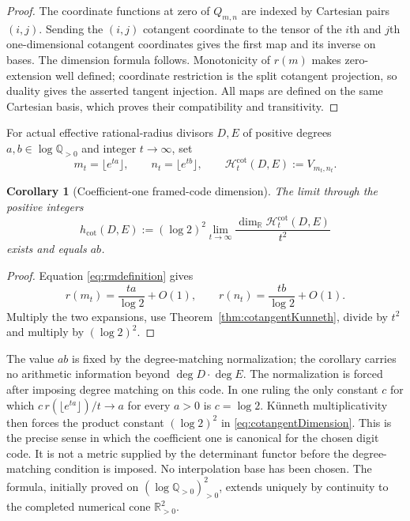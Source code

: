 \documentclass[11pt]{amsart}
\newtheorem{corollary}[theorem]{Corollary}
\theoremstyle{definition}
\theoremstyle{remark}
\newcommand{\R}{\mathbb R}
\newcommand{\Q}{\mathbb Q}
\begin{document}
\begin{proof}
The coordinate functions at zero of $Q_{m,n}$ are indexed by Cartesian
pairs $(i,j)$.  Sending the $(i,j)$ cotangent coordinate to the tensor of the
$i$th and $j$th one-dimensional cotangent coordinates gives the first map and its
inverse on bases.  The dimension formula follows.  Monotonicity of
$r(m)$ makes zero-extension well defined; coordinate restriction is the
split cotangent projection, so duality gives the asserted tangent
injection.  All maps are defined on the same Cartesian basis, which proves
their compatibility and transitivity.
\end{proof}

For actual effective rational-radius divisors $D,E$ of positive degrees
$a,b\in\log\Q_{>0}$ and integer $t\to\infty$, set
\begin{equation}\label{eq:scaledCode}
 m_t=\lfloor e^{ta}\rfloor,\qquad n_t=\lfloor e^{tb}\rfloor,\qquad
 \mathcal H_t^{\mathrm{cot}}(D,E):=V_{m_t,n_t}.
\end{equation}

\begin{corollary}[Coefficient-one framed-code dimension]
\label{cor:cotangentRRdimension}
The limit through the positive integers
\begin{equation}\label{eq:cotangentDimension}
 h_{\mathrm{cot}}(D,E):=(\log2)^2
 \lim_{t\to\infty}\frac{\dim_{\R}\mathcal H_t^{\mathrm{cot}}(D,E)}{t^2}
\end{equation}
exists and equals $ab$.
\end{corollary}

\begin{proof}
Equation \eqref{eq:rmdefinition} gives
\[
 r(m_t)=\frac{ta}{\log2}+O(1),\qquad
 r(n_t)=\frac{tb}{\log2}+O(1).
\]
Multiply the two expansions, use Theorem~\ref{thm:cotangentKunneth}, divide
by $t^2$ and multiply by $(\log2)^2$.
\end{proof}

The value $ab$ is fixed by the degree-matching normalization; the
corollary carries no arithmetic information beyond $\deg D\cdot\deg E$.
The normalization is forced after imposing degree matching on this code.
In one ruling the only constant
$c$ for which $c\,r(\lfloor e^{ta}\rfloor)/t\to a$ for every $a>0$ is
$c=\log2$.  K\"unneth multiplicativity then forces the product constant
$(\log2)^2$ in \eqref{eq:cotangentDimension}.  This is the precise sense in
which the coefficient one is canonical for the chosen digit code.  It is
not a metric supplied by the determinant functor before the degree-matching
condition is imposed.  No interpolation base has been chosen.  The formula,
initially proved on $(\log\Q_{>0})_{>0}^2$, extends uniquely by continuity to
the completed numerical cone $\R_{>0}^2$.
\end{document}
